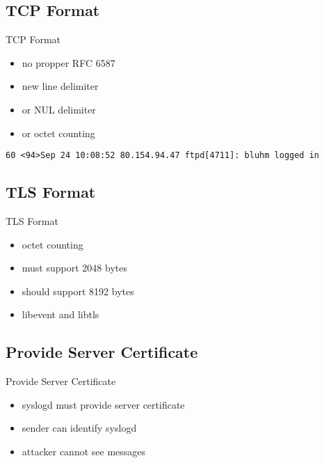 \documentclass[14pt]{beamer}
\begin{document}
\subsection{TCP Format}
\begin{frame}{TCP Format}
\begin{itemize}
    \item no propper RFC 6587
    \item new line delimiter
    \item or NUL delimiter
    \item or octet counting
\end{itemize}
    \texttt{60 <94>Sep 24 10:08:52 80.154.94.47 ftpd[4711]:\ bluhm logged in}
\end{frame}

\subsection{TLS Format}
\begin{frame}{TLS Format}
\begin{itemize}
    \item octet counting
    \item must support 2048 bytes
    \item should support 8192 bytes
    \item libevent and libtls
\end{itemize}
\end{frame}

\subsection{Provide Server Certificate}
\begin{frame}{Provide Server Certificate}
\begin{itemize}
    \item syslogd must provide server certificate
    \item sender can identify syslogd
    \item attacker cannot see messages
\end{itemize}
\end{frame}
\end{document}
